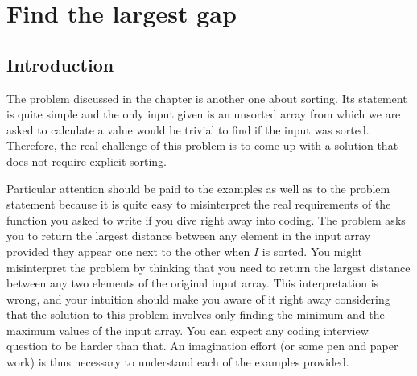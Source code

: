 


\chapter{Find the largest gap}
\label{ch:max_gap}
\section*{Introduction}
The problem discussed in the chapter is another one about sorting. Its statement is quite simple and
the only input given is an unsorted array from which we are asked to calculate a value would be
trivial to find if the input was sorted. Therefore, the real challenge of this problem is to come-up
with a solution that does not require explicit sorting.

Particular attention should be paid to the examples as well as to the problem statement because it
is quite easy to misinterpret the real requirements of the function you asked to write if you dive
right away into coding. The problem asks you to return the largest distance between any element in
the input array provided they appear one next to the other when $I$ is sorted. You might
misinterpret the problem by thinking that you need to return the largest distance between any two
elements of the original input array. This interpretation is wrong, and your intuition should make
you aware of it right away considering that the solution to this problem involves only finding the
minimum and the maximum values of the input array. You can expect any coding interview question to
be harder than that. An imagination effort (or some pen and paper work) is thus necessary to
understand each of the examples provided.

